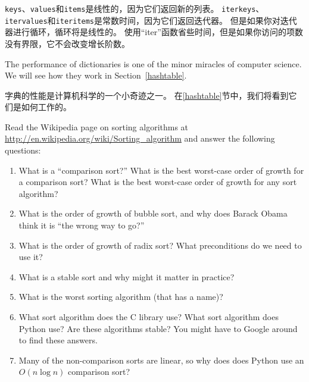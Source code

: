 \documentclass[10pt]{book}
\begin{document}
\begin{CJK}{UTF8}{gbsn}
\begin{itemize}
{\tt keys}、{\tt values}和{\tt items}是线性的，因为它们返回新的列表。
{\tt iterkeys}、{\tt itervalues}和{\tt iteritems}是常数时间，因为它们返回迭代器。
但是如果你对迭代器进行循环，循环将是线性的。
使用``iter''函数省些时间，但是如果你访问的项数没有界限，它不会改变增长阶数。

\end{itemize}

The performance of dictionaries is one of the minor miracles of
computer science.  We will see how they work in
Section~\ref{hashtable}.

字典的性能是计算机科学的一个小奇迹之一。
在\ref{hashtable}节中，我们将看到它们是如何工作的。


\begin{exercise}

Read the Wikipedia page on sorting algorithms at
\url{http://en.wikipedia.org/wiki/Sorting_algorithm} and answer
the following questions:

\begin{enumerate}

\item What is a ``comparison sort?'' What is the best worst-case order
  of growth for a comparison sort?  What is the best worst-case order
  of growth for any sort algorithm?

\item What is the order of growth of bubble sort, and why does Barack
  Obama think it is ``the wrong way to go?''

\item What is the order of growth of radix sort?  What preconditions
  do we need to use it?

\item What is a stable sort and why might it matter in practice?

\item What is the worst sorting algorithm (that has a name)?

\item What sort algorithm does the C library use?  What sort algorithm
  does Python use?  Are these algorithms stable?  You might have to
  Google around to find these answers.

\item Many of the non-comparison sorts are linear, so why does does
  Python use an $O(n \log n)$ comparison sort?

\end{enumerate}


\end{exercise}
\end{CJK}
\end{document}

